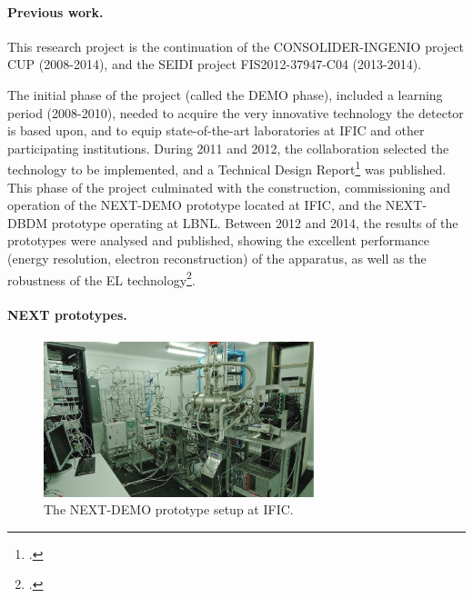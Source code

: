 %

\paragraph{Previous work.}
This research project is the continuation of the CONSOLIDER-INGENIO project CUP (2008-2014), and the SEIDI project FIS2012-37947-C04 (2013-2014). 

The initial phase of the project (called the DEMO phase), included a learning period (2008-2010), needed to acquire the very innovative technology the detector is based upon, and to equip state-of-the-art laboratories at IFIC and other participating institutions. 
During 2011 and 2012, the collaboration selected the technology to be implemented, and a Technical Design Report\footcite{Alvarez:2012haa} was published. This phase of the project culminated  with the construction, commissioning and operation of the NEXT-DEMO prototype located at IFIC, and the NEXT-DBDM prototype operating at LBNL. Between 2012 and 2014, the results of the prototypes were analysed and published, showing the excellent performance (energy resolution, electron reconstruction) of the apparatus, as well as the robustness of the EL technology\footcite{Alvarez:2012hh, Alvarez:2012nd, Alvarez:2012hu, Alvarez:2013gxa, Lorca:2014sra}. 

\paragraph{NEXT prototypes.}
\begin{figure}
\centering
\includegraphics[width=0.7\textwidth]{img/DemoSetup.jpg}
\caption{\small The NEXT-DEMO prototype setup at IFIC.} \label{fig.DEMO}
\end{figure}

